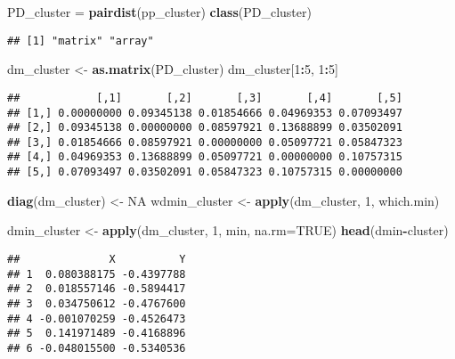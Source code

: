 \documentclass[
]{book}
\newenvironment{Shaded}{\begin{snugshade}}{\end{snugshade}}
\newcommand{\DataTypeTok}[1]{\textcolor[rgb]{0.13,0.29,0.53}{#1}}
\newcommand{\DecValTok}[1]{\textcolor[rgb]{0.00,0.00,0.81}{#1}}
\newcommand{\KeywordTok}[1]{\textcolor[rgb]{0.13,0.29,0.53}{\textbf{#1}}}
\newcommand{\NormalTok}[1]{#1}
\newcommand{\OperatorTok}[1]{\textcolor[rgb]{0.81,0.36,0.00}{\textbf{#1}}}
\newcommand{\OtherTok}[1]{\textcolor[rgb]{0.56,0.35,0.01}{#1}}
\newcommand{\StringTok}[1]{\textcolor[rgb]{0.31,0.60,0.02}{#1}}
\begin{document}
\begin{Shaded}
\begin{Highlighting}[]
\NormalTok{PD_cluster =}\StringTok{ }\KeywordTok{pairdist}\NormalTok{(pp_cluster)}
\KeywordTok{class}\NormalTok{(PD_cluster)}
\end{Highlighting}
\end{Shaded}

\begin{verbatim}
## [1] "matrix" "array"
\end{verbatim}

\begin{Shaded}
\begin{Highlighting}[]
\NormalTok{dm_cluster <-}\StringTok{ }\KeywordTok{as.matrix}\NormalTok{(PD_cluster)}
\NormalTok{dm_cluster[}\DecValTok{1}\OperatorTok{:}\DecValTok{5}\NormalTok{, }\DecValTok{1}\OperatorTok{:}\DecValTok{5}\NormalTok{]}
\end{Highlighting}
\end{Shaded}

\begin{verbatim}
##            [,1]       [,2]       [,3]       [,4]       [,5]
## [1,] 0.00000000 0.09345138 0.01854666 0.04969353 0.07093497
## [2,] 0.09345138 0.00000000 0.08597921 0.13688899 0.03502091
## [3,] 0.01854666 0.08597921 0.00000000 0.05097721 0.05847323
## [4,] 0.04969353 0.13688899 0.05097721 0.00000000 0.10757315
## [5,] 0.07093497 0.03502091 0.05847323 0.10757315 0.00000000
\end{verbatim}

\begin{Shaded}
\begin{Highlighting}[]
\KeywordTok{diag}\NormalTok{(dm_cluster) <-}\StringTok{ }\OtherTok{NA}
\NormalTok{wdmin_cluster <-}\StringTok{ }\KeywordTok{apply}\NormalTok{(dm_cluster, }\DecValTok{1}\NormalTok{, which.min)}

\NormalTok{dmin_cluster <-}\StringTok{ }\KeywordTok{apply}\NormalTok{(dm_cluster, }\DecValTok{1}\NormalTok{, min, }\DataTypeTok{na.rm=}\OtherTok{TRUE}\NormalTok{)}
\KeywordTok{head}\NormalTok{(dmin}\OperatorTok{-}\NormalTok{cluster)}
\end{Highlighting}
\end{Shaded}

\begin{verbatim}
##              X          Y
## 1  0.080388175 -0.4397788
## 2  0.018557146 -0.5894417
## 3  0.034750612 -0.4767600
## 4 -0.001070259 -0.4526473
## 5  0.141971489 -0.4168896
## 6 -0.048015500 -0.5340536
\end{verbatim}
\end{document}
